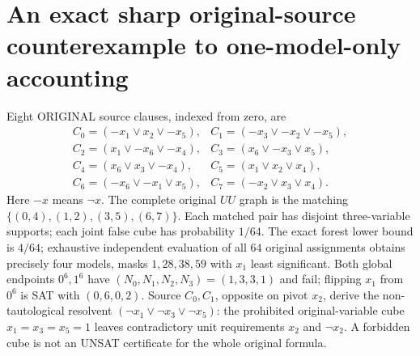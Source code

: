 \documentclass[10pt]{article}
\begin{document}
\section{An exact sharp original-source counterexample to one-model-only accounting}
Eight ORIGINAL source clauses, indexed from zero, are
\[
\begin{array}{ll}
C_0=(-x_1\vee x_2\vee-x_5),&C_1=(-x_3\vee-x_2\vee-x_5),\\
C_2=(x_1\vee-x_6\vee-x_4),&C_3=(x_6\vee-x_3\vee x_5),\\
C_4=(x_6\vee x_3\vee-x_4),&C_5=(x_1\vee x_2\vee x_4),\\
C_6=(-x_6\vee-x_1\vee x_5),&C_7=(-x_2\vee x_3\vee x_4).
\end{array}
\]
Here $-x$ means $\neg x$. The complete original $UU$ graph is the matching $\{(0,4),(1,2),(3,5),(6,7)\}$. Each matched pair has disjoint three-variable supports; each joint false cube has probability $1/64$. The exact forest lower bound is $4/64$; exhaustive independent evaluation of all $64$ original assignments obtains precisely four models, masks $1,28,38,59$ with $x_1$ least significant. Both global endpoints $0^6,1^6$ have $(N_0,N_1,N_2,N_3)=(1,3,3,1)$ and fail; flipping $x_1$ from $0^6$ is SAT with $(0,6,0,2)$. Source $C_0,C_1$, opposite on pivot $x_2$, derive the non-tautological resolvent $(\neg x_1\vee\neg x_3\vee\neg x_5)$: the prohibited original-variable cube $x_1=x_3=x_5=1$ leaves contradictory unit requirements $x_2$ and $\neg x_2$. A forbidden cube is not an UNSAT certificate for the whole original formula.
\end{document}
